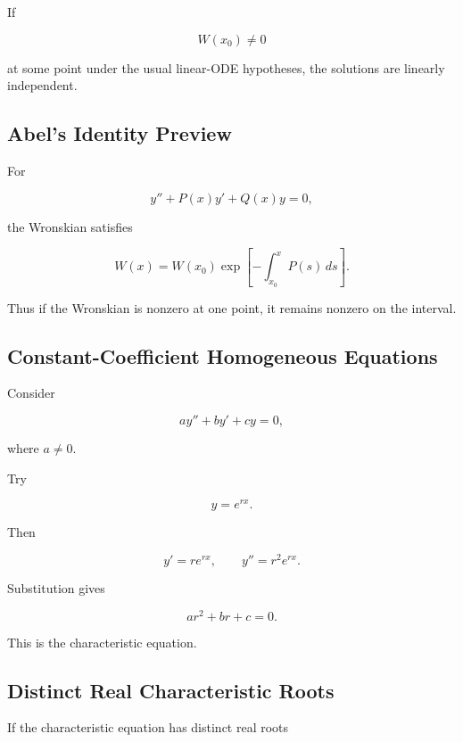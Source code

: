If

\[
W(x_0)\neq0
\]

at some point under the usual linear-ODE hypotheses, the solutions are
linearly independent.

\subsection{Abel's Identity Preview}
\label{subsec:abel-identity-preview}

For

\[
y''
+
P(x)y'
+
Q(x)y
=
0,
\]

the Wronskian satisfies

\[
\boxed{
W(x)
=
W(x_0)
\exp
\left[
-
\int_{x_0}^{x}
P(s)\,ds
\right].
}
\]

Thus if the Wronskian is nonzero at one point, it remains nonzero on the
interval.

\subsection{Constant-Coefficient Homogeneous Equations}
\label{subsec:constant-coefficient-homogeneous}

Consider

\[
\boxed{
ay''
+
by'
+
cy
=
0,
}
\]

where \(a\neq0\).

Try

\[
\boxed{
y=e^{rx}.
}
\]

Then

\[
y'=re^{rx},
\qquad
y''=r^2e^{rx}.
\]

Substitution gives

\[
\boxed{
ar^2+br+c=0.
}
\]

This is the characteristic equation.

\subsection{Distinct Real Characteristic Roots}
\label{subsec:distinct-real-roots}

If the characteristic equation has distinct real roots

